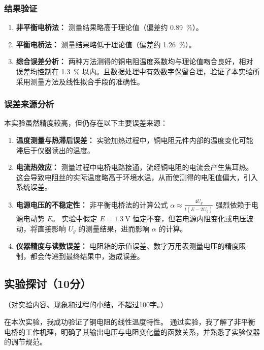\documentclass{../../templates/Report}%
\begin{document}
\begin{fullreportonly}
    \subsubsection{结果验证}
    \begin{enumerate}
        \item \textbf{非平衡电桥法：} 测量结果略高于理论值（偏差约 \SI{0.89}{\percent}）。
        \item \textbf{平衡电桥法：} 测量结果略低于理论值（偏差约 \SI{1.26}{\percent}）。
        \item \textbf{综合误差分析：} 两种方法测得的铜电阻温度系数均与理论值吻合良好，相对误差均控制在 \SI{1.3}{\percent} 以内。且数据处理中有效数字保留合理，验证了本实验所采用测量方法及线性拟合手段的准确性。
    \end{enumerate}

    \subsubsection{误差来源分析}
    本实验虽然精度较高，但仍存在以下主要误差来源：
    \begin{enumerate}
        \item \textbf{温度测量与热滞后误差：} 实验加热过程中，铜电阻元件内部的温度变化可能滞后于仪器读出的温度。
        \item \textbf{电流热效应：} 测量过程中电桥电路接通，流经铜电阻的电流会产生焦耳热。这会导致电阻丝的实际温度略高于环境水温，从而使测得的电阻值偏大，引入系统误差。
        \item \textbf{电源电压的不稳定性：} 非平衡电桥法的计算公式 $\alpha \approx \frac{4U_g}{t(E-2U_g)}$ 强烈依赖于电源电动势 $E$。
              实验中假定 $E=\SI{1.3}{\volt}$ 恒定不变，但若电源内阻变化或电压波动，将直接影响 $U_g$ 的测量结果，进而影响 $\alpha$ 的计算。
        \item \textbf{仪器精度与读数误差：} 电阻箱的示值误差、数字万用表测量电压的精度限制，都会传递到最终结果中，造成误差。
    \end{enumerate}

    \subsection{实验探讨（10分）}
    （对实验内容、现象和过程的小结，不超过100字。）

    在本次实验，我成功验证了铜电阻的线性温度特性。
    通过实验，我了解了非平衡电桥的工作机理，明确了其输出电压与电阻变化量的函数关系，并熟悉了实验仪器的调节规范。


\end{fullreportonly}
\end{document}
